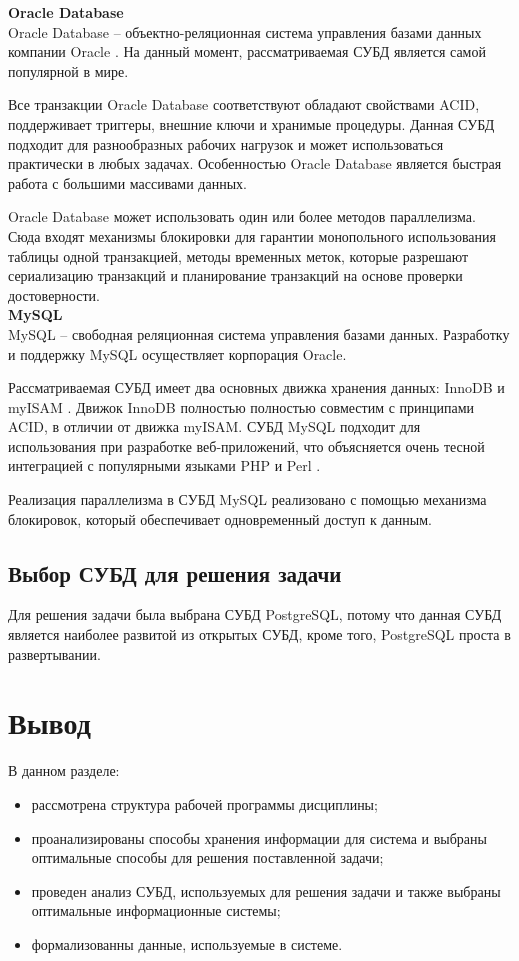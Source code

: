 \noindent\textbf{Oracle Database}\\

Oracle Database \cite{oracle} -- объектно-реляционная система управления базами данных компании Oracle \cite{oracle-company}. На данный момент, рассматриваемая СУБД является самой популярной в мире. \cite{oracle-popular}

Все транзакции Oracle Database соответствуют обладают свойствами ACID, поддерживает триггеры, внешние ключи и хранимые процедуры. Данная СУБД подходит для разнообразных рабочих нагрузок и может использоваться практически в любых задачах. Особенностью Oracle Database является быстрая работа с большими массивами данных.

Oracle Database может использовать один или более методов параллелизма. Сюда входят механизмы блокировки для гарантии монопольного использования таблицы одной транзакцией, методы временных меток, которые разрешают сериализацию транзакций и планирование транзакций на основе проверки достоверности. \\

\noindent\textbf{MySQL}\\

MySQL \cite{mysql} -- свободная реляционная система управления базами данных. Разработку и поддержку MySQL осуществляет корпорация Oracle.

Рассматриваемая СУБД имеет два основных движка хранения данных: InnoDB \cite{innodb} и myISAM \cite{myisam}. Движок InnoDB полностью полностью совместим с принципами ACID, в отличии от движка myISAM. СУБД MySQL подходит  для использования при разработке веб-приложений, что объясняется очень тесной интеграцией с популярными языками PHP \cite{php} и Perl \cite{perl}.

Реализация параллелизма в СУБД MySQL реализовано с помощью механизма блокировок, который обеспечивает одновременный доступ к данным.

\subsection{Выбор СУБД для решения задачи}

Для решения задачи была выбрана СУБД PostgreSQL, потому что данная СУБД является наиболее развитой из открытых СУБД, кроме того, PostgreSQL проста в развертывании.


\section*{Вывод}

В данном разделе:

\begin{itemize}
 \item рассмотрена структура рабочей программы дисциплины;
 \item проанализированы способы хранения информации для система и выбраны оптимальные способы для решения поставленной задачи; 
 \item проведен анализ СУБД, используемых для решения задачи и также выбраны оптимальные информационные системы; 
 \item формализованны данные, используемые в системе.
\end{itemize}

